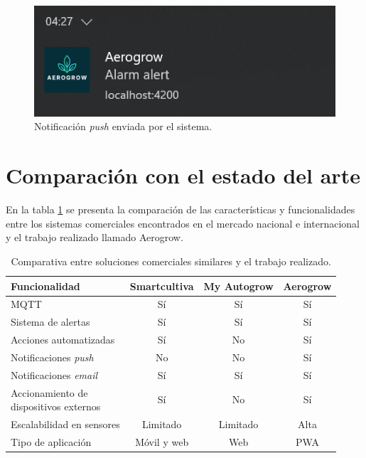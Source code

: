 \begin{figure}[H]
	\centering
	\includegraphics[width=.5\textwidth]{./Figures/Notificacion desktop prueba de integracion.png}
	\caption{Notificación \textit{push} enviada por el sistema.}
	\label{fig:notificacionDesktopruebaDeIntegracion}
\end{figure}

\section{Comparación con el estado del arte}

En la tabla \ref{tab:comparativaTrabajoSolucionesNacionalesInternacionales} se presenta la comparación de las características y funcionalidades entre los sistemas comerciales encontrados en el mercado nacional e internacional y el trabajo realizado llamado Aerogrow.

\begin{table}[H]
	\centering
	\caption[Comparativa entre soluciones comerciales similares y el trabajo realizado]{Comparativa entre soluciones comerciales similares y el trabajo realizado.}
	\begin{tabular}{l c c c}    
		\toprule
		\textbf{Funcionalidad} & \textbf{Smartcultiva} & \textbf{My Autogrow} & \textbf{Aerogrow}\\
		\midrule
		MQTT & Sí & Sí & Sí \\
		Sistema de alertas & Sí & Sí & Sí\\
		Acciones automatizadas & Sí & No & Sí\\
		Notificaciones \emph{push} & No & No & Sí\\
		Notificaciones \textit{email} & Sí & Sí & Sí\\
		\shortstack{Accionamiento de \\ dispositivos externos} & Sí & No & Sí\\
		Escalabilidad en sensores & Limitado & Limitado & Alta\\
		Tipo de aplicación & Móvil y web & Web & PWA\\
		\bottomrule
		\hline
	\end{tabular}
	\label{tab:comparativaTrabajoSolucionesNacionalesInternacionales}
\end{table}

